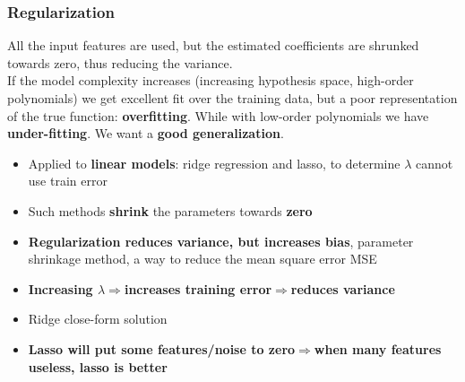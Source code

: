 \subsubsection{Regularization}
    All the input features are used, but the estimated coefficients are shrunked towards zero, thus reducing the variance.\\
    If the model complexity increases (increasing hypothesis space, high-order polynomials) we get excellent fit over the training data, but a poor representation of the true function: \textbf{overfitting}. While with low-order polynomials we have \textbf{under-fitting}. We want a \textbf{good generalization}.
    \begin{itemize}
        \item Applied to \textbf{linear models}: ridge regression and lasso, to determine $\lambda$ cannot use train error
        \item Such methods \textbf{shrink} the parameters towards \textbf{zero}
        \item \textbf{Regularization reduces variance, but increases bias}, parameter shrinkage method, a way to reduce the mean square error MSE
        \item \textbf{Increasing $\lambda\Rightarrow$increases training error$\Rightarrow$reduces variance}
        \item Ridge close-form solution
        \item \textbf{Lasso will put some features/noise to zero$\Rightarrow$when many features useless, lasso is better}
    \end{itemize}
